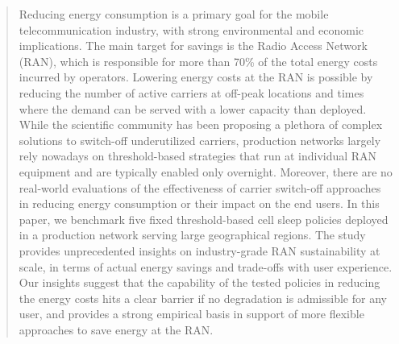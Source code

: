 \documentclass[10pt, conference, letterpaper]{IEEEtran}
\newcommand{\om}[1]{\textcolor{purple}{[Orlando -- #1]}}
\begin{document}
\begin{abstract}

Reducing energy consumption is a primary goal for the mobile telecommunication industry, with strong environmental and economic implications. The main target for savings is the Radio Access Network (RAN), which is responsible for more than 70\% of the total energy costs incurred by operators.
Lowering energy costs at the RAN is possible by reducing the number of active carriers at off-peak locations and times where the demand can be served with a lower capacity than deployed.
While the scientific community has been proposing a plethora of complex solutions to switch-off underutilized carriers, production networks largely rely nowadays on threshold-based strategies that run at individual RAN equipment and are typically enabled only overnight.
Moreover, there are no real-world evaluations of the effectiveness of carrier switch-off approaches in reducing energy consumption or their impact on the end users.
In this paper, we benchmark five %
fixed threshold-based cell sleep policies deployed in a production network serving large geographical regions.
The study provides unprecedented insights on industry-grade RAN sustainability at scale, in terms of actual energy savings and trade-offs with user experience. Our insights suggest that the capability of the tested policies in reducing the energy costs hits a clear barrier if no degradation is admissible for any user, and provides a strong empirical basis in support of more flexible approaches to save energy at the RAN.




\end{abstract}
\end{document}

